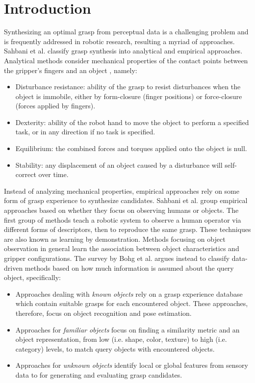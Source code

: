 \section{Introduction}

Synthesizing an optimal grasp from perceptual data is a challenging problem and is frequently addressed in
robotic research, resulting a myriad of approaches. Sahbani et al. \cite{Sahbani2012} classify grasp synthesis
into analytical and empirical approaches. Analytical methods consider mechanical properties of the contact
points between the gripper's fingers and an object \cite{Roa2015,Sahbani2012,Shimoga1996}, namely:
\begin{itemize}
\item Disturbance resistance: ability of the grasp to resist disturbances when the object is immobile, either by
form-closure (finger positions) or force-closure (forces applied by fingers).
\item Dexterity: ability of the robot hand to move the object to perform a specified task, or in any direction if
no task is specified.
\item Equilibrium: the combined forces and torques applied onto the object is null.
\item Stability: any displacement of an object caused by a disturbance will self-correct over time.
\end{itemize}
Instead of analyzing mechanical properties, empirical approaches rely on some form of grasp experience to synthesize
candidates. Sahbani et al. \cite{Sahbani2012} group empirical approaches based on whether they focus on observing humans
or objects. The first group of methods teach a robotic system to observe a human operator via different forms of
descriptors, then to reproduce the same grasp. These techniques are also known as learning by demonstration.
Methods focusing on object observation in general learn the association between object characteristics and gripper
configurations. The survey by Bohg et al. \cite{Bohg2014} argues instead to classify data-driven methods based on how
much information is assumed about the query object, specifically:
\begin{itemize}
    \item Approaches dealing with \emph{known objects} rely on a grasp experience database which contain suitable grasps
    for each encountered object. These approaches, therefore, focus on object recognition and pose estimation.
    \item Approaches for \emph{familiar objects} focus on finding a similarity metric and an object representation,
    from low (i.e. shape, color, texture) to high (i.e. category) levels, to match query objects with encountered
    objects.
    \item Approaches for \emph{unknown objects} identify local or global features from sensory data to for generating
    and evaluating grasp candidates.
\end{itemize}
